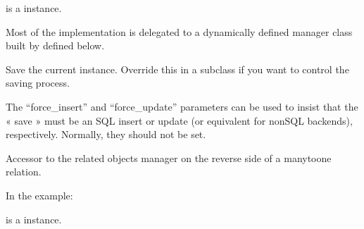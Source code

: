 \documentclass[letterpaper,10pt,french]{sphinxmanual}
\begin{document}
\begin{fulllineitems}
\begin{fulllineitems}
\sphinxAtStartPar
{} is a  instance.

\sphinxAtStartPar
Most of the implementation is delegated to a dynamically defined manager
class built by  defined below.

\end{fulllineitems}


\begin{fulllineitems}
\label{\detokenize{main/model:main.models.Semestre.save}}
\pysigstartsignatures
{}
\pysigstopsignatures
\sphinxAtStartPar
Save the current instance. Override this in a subclass if you want to
control the saving process.

\sphinxAtStartPar
The “force\_insert” and “force\_update” parameters can be used to insist
that the « save » must be an SQL insert or update (or equivalent for
non\sphinxhyphen{}SQL backends), respectively. Normally, they should not be set.

\end{fulllineitems}


\begin{fulllineitems}
\label{\detokenize{main/model:main.models.Semestre.seance_set}}
\pysigstartsignatures
{}
\pysigstopsignatures
\sphinxAtStartPar
Accessor to the related objects manager on the reverse side of a
many\sphinxhyphen{}to\sphinxhyphen{}one relation.

\sphinxAtStartPar
In the example:

\begin{sphinxVerbatim}[commandchars=\\\{\}]
 
       
\end{sphinxVerbatim}

\sphinxAtStartPar
{} is a  instance.


\end{fulllineitems}
\end{fulllineitems}
\end{document}

